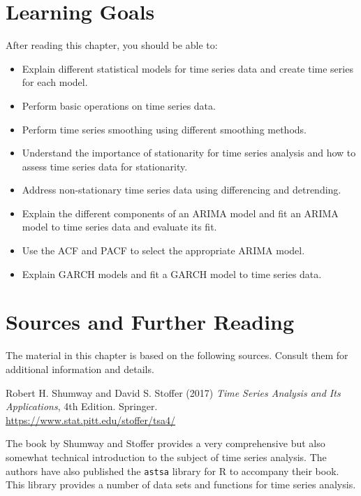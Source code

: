 %
%
\section*{Learning Goals}

After reading this chapter, you should be able to:
\begin{itemize}
   \item Explain different statistical models for time series data and create time series for each model.
   \item Perform basic operations on time series data.
   \item Perform time series smoothing using different smoothing methods.
   \item Understand the importance of stationarity for time series analysis and how to assess time series data for stationarity.
   \item Address non-stationary time series data using differencing and detrending.
   \item Explain the different components of an ARIMA model and fit an ARIMA model to time series data and evaluate its fit. 
   \item Use the ACF and PACF to select the appropriate ARIMA model.
   \item Explain GARCH models and fit a GARCH model to time series data.
\end{itemize}

\section*{Sources and Further Reading}

The material in this chapter is based on the following sources. Consult them for additional information and details.

\begin{resourcebox}
Robert H. Shumway and David S. Stoffer (2017) \emph{Time Series Analysis and Its Applications}, 4th Edition. Springer.\\

\small\url{https://www.stat.pitt.edu/stoffer/tsa4/}\normalsize
\end{resourcebox}

The book by Shumway and Stoffer provides a very comprehensive but also somewhat technical introduction to the subject of time series analysis. The authors have also published the \texttt{astsa} library for R to accompany their book. This library provides a number of data sets and functions for time series analysis. 

